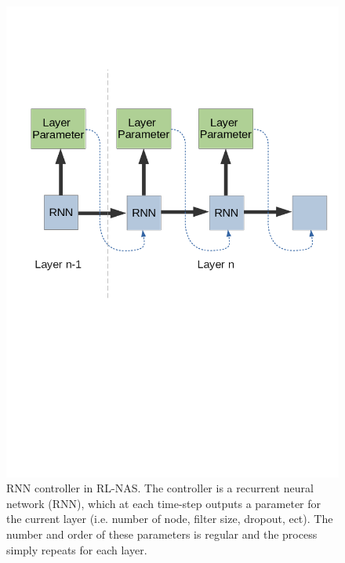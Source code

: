 \documentclass{article}
\begin{document}
	\begin{figure}[h]

			\includegraphics[trim=0 320 0 150 ,scale=0.3]{NAS-RL.png}
			\centering
			\caption{RNN controller in RL-NAS. The controller is a recurrent neural network (RNN), which at each time-step outputs a parameter for the current layer (i.e. number of node, filter size, dropout, ect). The number and order of these parameters is regular and the process simply repeats for each layer.   
			}
			\label{fig:RL}

	\end{figure}
\end{document}

